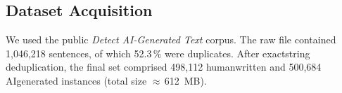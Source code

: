 \subsection{Dataset Acquisition}  %
We used the public \emph{Detect AI-Generated Text} corpus. The raw file contained
1{,}046{,}218 sentences, of which 52.3\,\% were duplicates.
After exact\textendash string de\textendash duplication, the final set comprised
498{,}112 human\textendash written and 500{,}684 AI\textendash generated
instances (total size $\approx$\,612~MB).